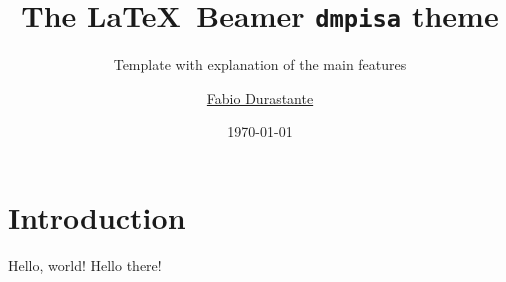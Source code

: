 \documentclass{beamer}
\title{The \LaTeX\, Beamer \texttt{dmpisa} theme}
\subtitle{Template with explanation of the main features}
\author{\href{mailto:fabio.durastante@unipi.it}{Fabio Durastante}}
\date{\today}
\begin{document}
\maketitle
\section{Introduction}
\begin{frame}{Hello, world!}
Hello there!
\end{frame}
\backmatter
\end{document}
